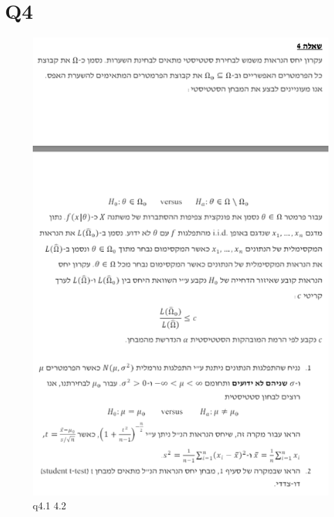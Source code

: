 \newpage

\section{Q4}

\begin{figure}[htbp]
    \centering
    \includegraphics[width=0.65\linewidth]{images/q41.png}
    \caption{q4.1 4.2}
    \label{fig:q4.1}
\end{figure}

